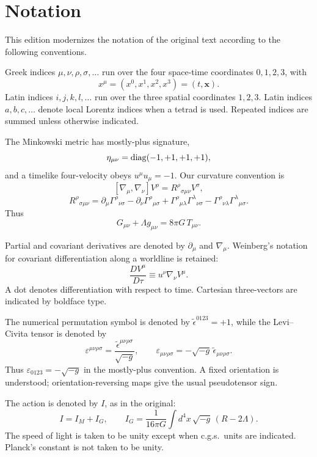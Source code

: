 
\section*{Notation}

This edition modernizes the notation of the original text according to the
following conventions.

Greek indices $\mu,\nu,\rho,\sigma,\ldots$ run over the four space-time
coordinates $0,1,2,3$, with
\[
  x^\mu=(x^0,x^1,x^2,x^3)=(t,\mathbf{x}).
\]
Latin indices $i,j,k,l,\ldots$ run over the three spatial coordinates
$1,2,3$. Latin indices $a,b,c,\ldots$ denote local Lorentz indices when a
tetrad is used. Repeated indices are summed unless otherwise indicated.

The Minkowski metric has mostly-plus signature,
\[
  \eta_{\mu\nu}=\operatorname{diag}(-1,+1,+1,+1),
\]
and a timelike four-velocity obeys $u^\mu u_\mu=-1$. Our curvature convention
is
\[
  [\nabla_\mu,\nabla_\nu]V^\rho
  =R^\rho{}_{\sigma\mu\nu}V^\sigma,
\]
\[
  R^\rho{}_{\sigma\mu\nu}
  =\partial_\mu\Gamma^\rho{}_{\nu\sigma}
  -\partial_\nu\Gamma^\rho{}_{\mu\sigma}
  +\Gamma^\rho{}_{\mu\lambda}\Gamma^\lambda{}_{\nu\sigma}
  -\Gamma^\rho{}_{\nu\lambda}\Gamma^\lambda{}_{\mu\sigma}.
\]
Thus
\[
  G_{\mu\nu}+\Lambda g_{\mu\nu}=8\pi G\,T_{\mu\nu}.
\]

Partial and covariant derivatives are denoted by $\partial_\mu$ and
$\nabla_\mu$. Weinberg's notation for covariant differentiation along a
worldline is retained:
\[
  \frac{D V^\mu}{D\tau}\equiv u^\nu\nabla_\nu V^\mu.
\]
A dot denotes differentiation with respect to time. Cartesian three-vectors
are indicated by boldface type.

The numerical permutation symbol is denoted by
$\tilde\epsilon^{0123}=+1$, while the Levi--Civita tensor is denoted by
\[
  \varepsilon^{\mu\nu\rho\sigma}
  =\frac{\tilde\epsilon^{\mu\nu\rho\sigma}}{\sqrt{-g}},
  \qquad
  \varepsilon_{\mu\nu\rho\sigma}
  =-\sqrt{-g}\,\tilde\epsilon_{\mu\nu\rho\sigma}.
\]
Thus $\varepsilon_{0123}=-\sqrt{-g}$ in the mostly-plus convention. A fixed
orientation is understood; orientation-reversing maps give the usual
pseudotensor sign.

The action is denoted by $I$, as in the original:
\[
  I=I_M+I_G,\qquad
  I_G=\frac{1}{16\pi G}\int d^4x\,\sqrt{-g}\,(R-2\Lambda).
\]
The speed of light is taken to be unity except when c.g.s.\ units are
indicated. Planck's constant is not taken to be unity.
